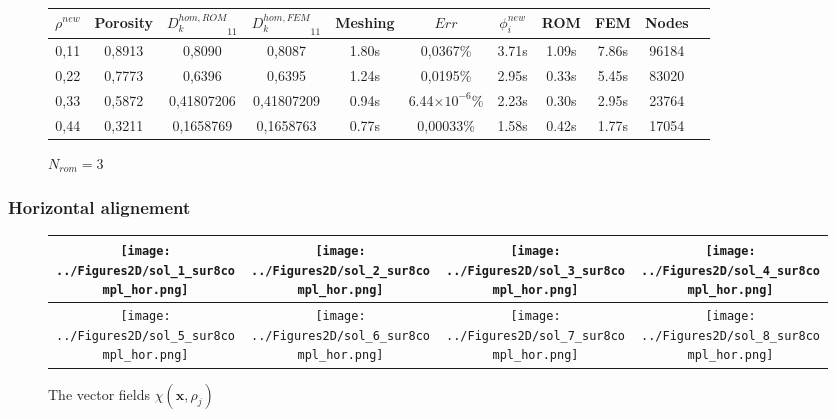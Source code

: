 \begin{figure}[H]%
%
\begin{center}
\begin{tabular}{|c|c||c|c||c||c|c||c|c||c||c|}
\hline
$\rho^{new}$&Porosity&${D_k^{hom,ROM}}_{11}$&${D_k^{hom,FEM}}_{11}$&Meshing&$Err$&$\phi_i^{new}$&ROM&FEM&Nodes\\
\hline
0,11&0,8913&0,8090&0,8087&1.80s&0,0367\%&3.71s&1.09s&7.86s&96184\\
\hline
0,22&0,7773&0,6396&0,6395&1.24s&0,0195\%&2.95s&0.33s&5.45s&83020\\
\hline
0,33&0,5872&0,41807206&0,41807209&0.94s&6.44$\times 10^{-6}$\%&2.23s&0.30s&2.95s&23764\\
\hline
0,44&0,3211&0,1658769&0,1658763&0.77s&0,00033\%&1.58s&0.42s&1.77s&17054\\
\hline
\end{tabular}
\end{center}
\caption{$N_{rom}=3$}
%
\end{figure}

\subsubsection{Horizontal alignement}

\begin{figure}[H]
\begin{center}
\begin{tabular}{|c|c|c|c|}
\hline
\texttt{[image: ../Figures2D/sol\_1\_sur8compl\_hor.png]}%
&%
\texttt{[image: ../Figures2D/sol\_2\_sur8compl\_hor.png]}%
&%
\texttt{[image: ../Figures2D/sol\_3\_sur8compl\_hor.png]}%
&%
\texttt{[image: ../Figures2D/sol\_4\_sur8compl\_hor.png]}%
\\
\hline
\texttt{[image: ../Figures2D/sol\_5\_sur8compl\_hor.png]}%
&%
\texttt{[image: ../Figures2D/sol\_6\_sur8compl\_hor.png]}%
&%
\texttt{[image: ../Figures2D/sol\_7\_sur8compl\_hor.png]}%
&%
\texttt{[image: ../Figures2D/sol\_8\_sur8compl\_hor.png]}%
\\
\hline
\end{tabular}
\end{center}
\caption{The vector fields $\chi(\mathbf{x},\rho_j )$}
\end{figure}


